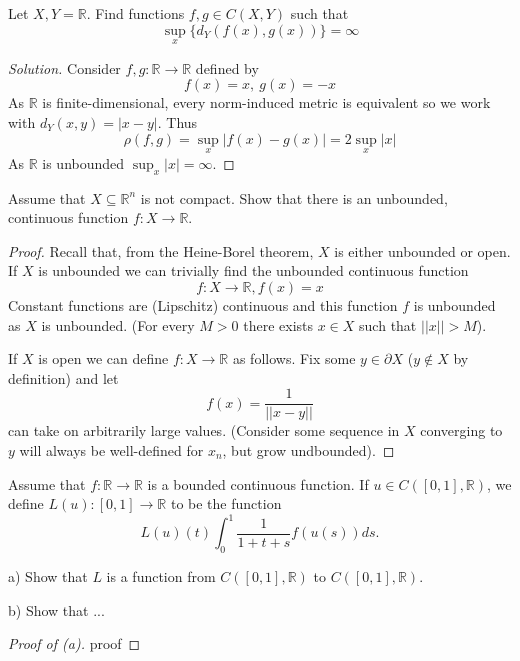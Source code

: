 \begin{prob}
    Let $X,Y = \mathbb R$. Find functions $f,g \in C(X,Y)$ such 
    that 
    \[
        \sup_x\{d_Y(f(x),g(x))\} = \infty
    \]
\end{prob}
\begin{proof}[Solution]
    Consider $f,g : \mathbb R \to \mathbb R$ defined by 
    \[
        f(x) = x, \ g(x) = -x
    \]
    As $\mathbb R$ is finite-dimensional, every norm-induced metric 
    is equivalent so we work with $d_Y(x,y) = |x-y|$. 
    Thus 
    \[
        \rho(f,g) = \sup_x |f(x) - g(x)| 
        = 2 \sup_x|x|
    \]
    As $\mathbb R$ is unbounded $\sup_x|x| = \infty$. 
\end{proof}
\begin{prob}
    Assume that $X \subseteq \mathbb R^n$ is not compact. 
    Show that there is an unbounded, continuous function 
    $f : X \to \mathbb R$. 
\end{prob}
\begin{proof}
    Recall that, from the Heine-Borel theorem, $X$ is either 
    unbounded or open. If $X$ is unbounded we can trivially find 
    the unbounded continuous function
    \[
        f : X \to \mathbb R, f(x) = x
    \]
    Constant functions are (Lipschitz) continuous and 
    this function $f$ is unbounded as $X$ is unbounded. 
    (For every $M > 0$ there exists $x \in X$ such that 
    $||x|| > M$). 

    If $X$ is open we can define $f : X \to \mathbb R$ as follows. 
    Fix some $y \in \partial X$ ($y \not\in X$ by definition) and 
    let 
    \[
        f(x) = \frac{1}{||x - y||}
    \]
    can take on arbitrarily large values. (Consider some 
    sequence in $X$ converging to $y$ will always be well-defined  
    for $x_n$, but grow undbounded).  
\end{proof}
\begin{prob}
    Assume that $f : \mathbb R \to \mathbb R$ is a bounded 
    continuous function. If $u \in C([0,1],\mathbb R)$, we 
    define $L(u):[0,1]\to \mathbb R$ to be the function 
    \[
        L(u)(t) \int_{0}^1 \frac{1}{1+t+s}f(u(s)) ds.
    \]

    a) Show that $L$ is a function from $C([0,1],\mathbb R)$ to 
    $C([0,1],\mathbb R)$. 

    b) Show that ... 
\end{prob}
\begin{proof}[Proof of (a)]
    proof
\end{proof}

